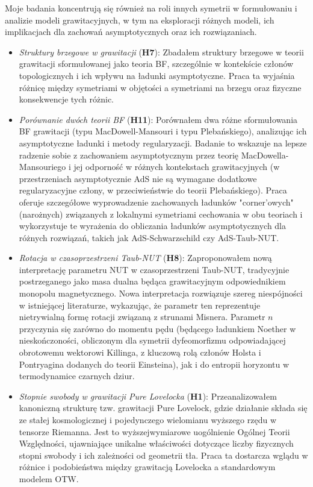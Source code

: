 \documentclass[12pt,a4paper]{article}
\begin{document}
Moje badania koncentrują się również na roli innych symetrii w formułowaniu i analizie modeli grawitacyjnych, w tym na eksploracji różnych modeli, ich implikacjach dla zachowań asymptotycznych oraz ich rozwiązaniach.
\begin{itemize}
	\item \textit{Struktury brzegowe w grawitacji} (\textbf{H7}): Zbadałem struktury brzegowe w teorii grawitacji sformułowanej jako teoria BF, szczególnie w kontekście członów topologicznych i ich wpływu na ładunki asymptotyczne. Praca ta wyjaśnia różnicę między symetriami w objętości a symetriami na brzegu oraz fizyczne konsekwencje tych różnic.
	
	\item \textit{Porównanie dwóch teorii BF} (\textbf{H11}): Porównałem dwa różne sformułowania BF grawitacji (typu MacDowell-Mansouri i typu Plebańskiego), analizując ich asymptotyczne ładunki i metody regularyzacji. Badanie to wskazuje na lepsze radzenie sobie z zachowaniem asymptotycznym przez teorię MacDowella-Mansouriego i jej odporność w różnych kontekstach grawitacyjnych (w przestrzeniach asymptotycznie AdS nie są wymagane dodatkowe regularyzacyjne człony, w przeciwieństwie do teorii Plebańskiego). Praca oferuje szczegółowe wyprowadzenie zachowanych ładunków "corner'owych" (narożnych) związanych z lokalnymi symetriami cechowania w obu teoriach i wykorzystuje te wyrażenia do obliczania ładunków asymptotycznych dla różnych rozwiązań, takich jak AdS-Schwarzschild czy AdS-Taub-NUT.
	
	\item \textit{Rotacja w czasoprzestrzeni Taub-NUT} (\textbf{H8}): Zaproponowałem nową interpretację parametru NUT w czasoprzestrzeni Taub-NUT, tradycyjnie postrzeganego jako masa dualna będąca grawitacyjnym odpowiednikiem monopolu magnetycznego. Nowa interpretacja rozwiązuje szereg niespójności w istniejącej literaturze, wykazując, że parametr ten reprezentuje nietrywialną formę rotacji związaną z strunami Misnera. Parametr $n$ przyczynia się zarówno do momentu pędu (będącego ładunkiem Noether w nieskończoności, obliczonym dla symetrii dyfeomorfizmu odpowiadającej obrotowemu wektorowi Killinga, z kluczową rolą członów Holsta i Pontryagina dodanych do teorii Einsteina), jak i do entropii horyzontu w termodynamice czarnych dziur.
	
	\item \textit{Stopnie swobody w grawitacji Pure Lovelocka} (\textbf{H1}): Przeanalizowałem kanoniczną strukturę tzw. grawitacji Pure Lovelock, gdzie działanie składa się ze stałej kosmologicznej i pojedynczego wielomianu wyższego rzędu w tensorze Riemanna. Jest to wyższejwymiarowe uogólnienie Ogólnej Teorii Względności, ujawniające unikalne właściwości dotyczące liczby fizycznych stopni swobody i ich zależności od geometrii tła. Praca ta dostarcza wglądu w różnice i podobieństwa między grawitacją Lovelocka a standardowym modelem OTW.
	
\end{itemize}
\end{document}

